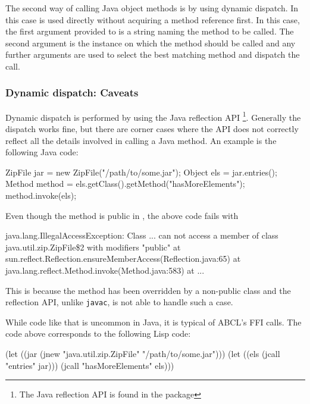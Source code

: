 \documentclass[10pt]{book}
\begin{document}
The second way of calling Java object methods is by using dynamic dispatch.
In this case  is used directly without acquiring a method
reference first. In this case, the first argument provided to 
is a string naming the method to be called. The second argument is the instance
on which the method should be called and any further arguments are used to
select the best matching method and dispatch the call.

\subsubsection{Dynamic dispatch: Caveats}

Dynamic dispatch is performed by using the Java reflection
API \footnote{The Java reflection API is found in the
   package}. Generally the dispatch works
fine, but there are corner cases where the API does not correctly
reflect all the details involved in calling a Java method. An example
is the following Java code:

\begin{listing-java}
ZipFile jar = new ZipFile("/path/to/some.jar");
Object els = jar.entries();
Method method = els.getClass().getMethod("hasMoreElements");
method.invoke(els);
\end{listing-java}

Even though the method  is public in
, the above code fails with

\begin{listing-java}
java.lang.IllegalAccessException: Class ... can
not access a member of class java.util.zip.ZipFile\$2 with modifiers
"public"
       at sun.reflect.Reflection.ensureMemberAccess(Reflection.java:65)
       at java.lang.reflect.Method.invoke(Method.java:583)
       at ...
\end{listing-java}

This is because the method has been overridden by a non-public class and
the reflection API, unlike \texttt{javac}, is not able to handle such a case.

While code like that is uncommon in Java, it is typical of ABCL's FFI
calls. The code above corresponds to the following Lisp code:

\begin{listing-lisp}
(let ((jar (jnew "java.util.zip.ZipFile" "/path/to/some.jar")))
  (let ((els (jcall "entries" jar)))
    (jcall "hasMoreElements" els)))
\end{listing-lisp}
\end{document}
